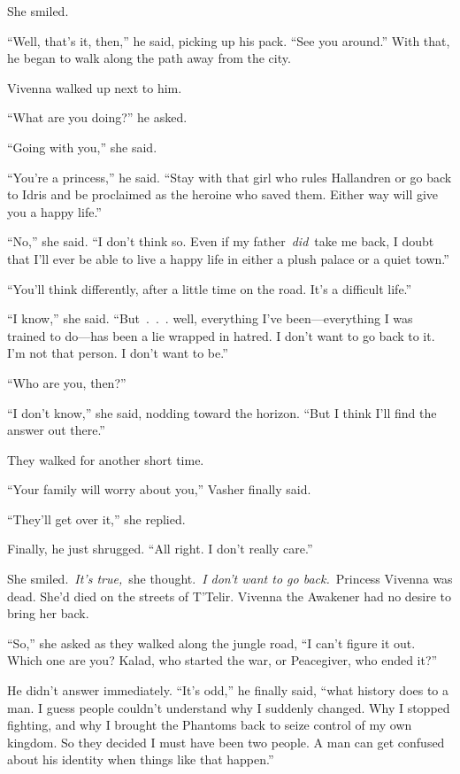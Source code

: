 She smiled.

“Well, that’s it, then,” he said, picking up his pack. “See you around.” With that, he began to walk along the path away from the city.

Vivenna walked up next to him.

“What are you doing?” he asked.

“Going with you,” she said.

“You’re a princess,” he said. “Stay with that girl who rules Hallandren or go back to Idris and be proclaimed as the heroine who saved them. Either way will give you a happy life.”

“No,” she said. “I don’t think so. Even if my father~\textit{did}~take me back, I doubt that I’ll ever be able to live a happy life in either a plush palace or a quiet town.”

“You’ll think differently, after a little time on the road. It’s a difficult life.”

“I know,” she said. “But~.~.~. well, everything I’ve been—everything I was trained to do—has been a lie wrapped in hatred. I don’t want to go back to it. I’m not that person. I don’t want to be.”

“Who are you, then?”

“I don’t know,” she said, nodding toward the horizon. “But I think I’ll find the answer out there.”

They walked for another short time.

“Your family will worry about you,” Vasher finally said.

“They’ll get over it,” she replied.

Finally, he just shrugged. “All right. I don’t really care.”

She smiled.~\textit{It’s true,}~she thought.~\textit{I don’t want to go back.}~Princess Vivenna was dead. She’d died on the streets of T’Telir. Vivenna the Awakener had no desire to bring her back.

“So,” she asked as they walked along the jungle road, “I can’t figure it out. Which one are you? Kalad, who started the war, or Peacegiver, who ended it?”

He didn’t answer immediately. “It’s odd,” he finally said, “what history does to a man. I guess people couldn’t understand why I suddenly changed. Why I stopped fighting, and why I brought the Phantoms back to seize control of my own kingdom. So they decided I must have been two people. A man can get confused about his identity when things like that happen.”

